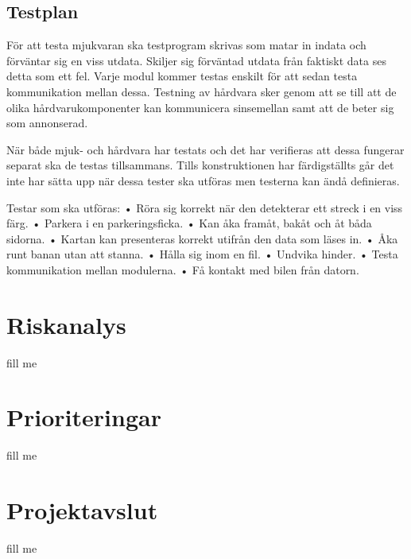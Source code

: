 \documentclass[projektplan/plan.tex]{subfiles}
\begin{document}
\subsection{Testplan}
För att testa mjukvaran ska testprogram skrivas som matar in indata och förväntar sig en viss utdata. Skiljer sig förväntad utdata från faktiskt data ses detta som ett fel. Varje modul kommer testas enskilt för att sedan testa kommunikation mellan dessa. Testning av hårdvara sker genom att se till att de olika hårdvarukomponenter kan kommunicera sinsemellan samt att de beter sig som annonserad.

När både mjuk- och hårdvara har testats och det har verifieras att dessa fungerar separat ska de testas tillsammans. Tills konstruktionen har färdigställts går det inte har sätta upp när dessa tester ska utföras men testerna kan ändå definieras.

Testar som ska utföras:
•	Röra sig korrekt när den detekterar ett streck i en viss färg.
•	Parkera i en parkeringsficka.
•	Kan åka framåt, bakåt och åt båda sidorna.
•	Kartan kan presenteras korrekt utifrån den data som läses in.
•	Åka runt banan utan att stanna.
•	Hålla sig inom en fil.
•	Undvika hinder.
•	Testa kommunikation mellan modulerna.
•	Få kontakt med bilen från datorn.

\section{Riskanalys}
fill me

\section{Prioriteringar}
fill me

\section{Projektavslut}
fill me
\end{document}
